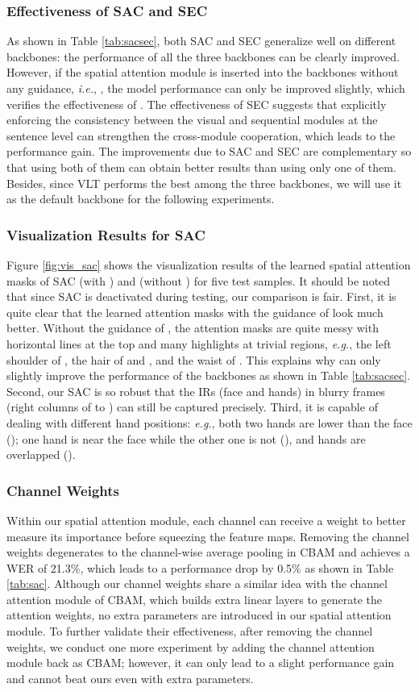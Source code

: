 \documentclass[acmsmall,screen]{acmart}
\def\eg{\emph{e.g.}} \def\Eg{\emph{E.g.}}
\def\ie{\emph{i.e.}} \def\Ie{\emph{I.e.}}
\begin{document}
 \subsubsection{Effectiveness of SAC and SEC}
As shown in Table \ref{tab:sacsec}, both SAC and SEC generalize well on different backbones: the performance of all the three backbones can be clearly improved.
However, if the spatial attention module is inserted into the backbones without any guidance, \ie, , the model performance can only be improved slightly, which verifies the effectiveness of .
The effectiveness of SEC suggests that explicitly enforcing the consistency between the visual and sequential modules at the sentence level can strengthen the cross-module cooperation, which leads to the performance gain.
The improvements due to SAC and SEC are complementary so that using both of them can obtain better results than using only one of them.
Besides, since VLT performs the best among the three backbones, we will use it as the default backbone for the following experiments.

\subsubsection{Visualization Results for SAC}
Figure \ref{fig:vis_sac} shows the visualization results of the learned spatial attention masks of SAC (with ) and  (without ) for five test samples.
It should be noted that since SAC is deactivated during testing, our comparison is fair.
First, it is quite clear that the learned attention masks with the guidance of  look much better.
Without the guidance of , the attention masks are quite messy with horizontal lines at the top and many highlights at trivial regions, \eg, the left shoulder of , the hair of  and , and the waist of .
This explains why  can only slightly improve the performance of the backbones as shown in Table \ref{tab:sacsec}.
Second, our SAC is so robust that the IRs (face and hands) in blurry frames (right columns of  to ) can still be captured precisely.
Third, it is capable of dealing with different hand positions: \eg, both two hands are lower than the face (); one hand is near the face while the other one is not (), and hands are overlapped ().

\subsubsection{Channel Weights}
Within our spatial attention module, each channel can receive a weight to better measure its importance before squeezing the feature maps.
Removing the channel weights degenerates to the channel-wise average pooling in CBAM \cite{woo2018cbam} and achieves a WER of 21.3\%, which leads to a performance drop by 0.5\% as shown in Table \ref{tab:sac}.
Although our channel weights share a similar idea with the channel attention module of CBAM, which builds extra linear layers to generate the attention weights, no extra parameters are introduced in our spatial attention module.
To further validate their effectiveness, after removing the channel weights, we conduct one more experiment by adding the channel attention module back as CBAM; however, it can only lead to a slight performance gain and cannot beat ours even with extra parameters.
\end{document}
